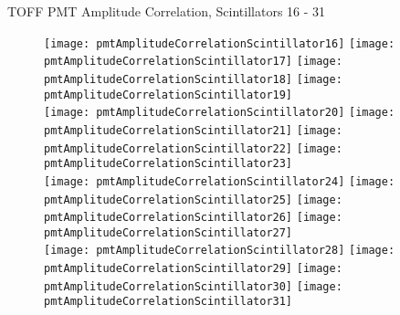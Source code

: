 \documentclass[11pt]{beamer}
\begin{document}
\begin{frame}{TOFF PMT Amplitude Correlation, Scintillators 16 - 31}
\begin{figure}
\centering
\texttt{[image: pmtAmplitudeCorrelationScintillator16]}
\texttt{[image: pmtAmplitudeCorrelationScintillator17]}
\texttt{[image: pmtAmplitudeCorrelationScintillator18]}
\texttt{[image: pmtAmplitudeCorrelationScintillator19]} \\
\texttt{[image: pmtAmplitudeCorrelationScintillator20]}
\texttt{[image: pmtAmplitudeCorrelationScintillator21]}
\texttt{[image: pmtAmplitudeCorrelationScintillator22]}
\texttt{[image: pmtAmplitudeCorrelationScintillator23]} \\
\texttt{[image: pmtAmplitudeCorrelationScintillator24]}
\texttt{[image: pmtAmplitudeCorrelationScintillator25]}
\texttt{[image: pmtAmplitudeCorrelationScintillator26]}
\texttt{[image: pmtAmplitudeCorrelationScintillator27]} \\
\texttt{[image: pmtAmplitudeCorrelationScintillator28]}
\texttt{[image: pmtAmplitudeCorrelationScintillator29]}
\texttt{[image: pmtAmplitudeCorrelationScintillator30]}
\texttt{[image: pmtAmplitudeCorrelationScintillator31]} \\
\end{figure}
\end{frame}
\end{document}
